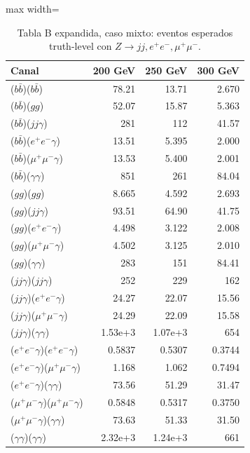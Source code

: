 \documentclass[10pt]{article}
\begin{document}
\begin{table}[H]
\centering
\scriptsize
\caption{Tabla B expandida, caso mixto: eventos esperados truth-level con $Z\to jj,e^+e^-,\mu^+\mu^-$.}
\label{tab:B_mixto}
\begin{adjustbox}{max width=\textwidth}
\begin{tabular}{lrrr}
\toprule
Canal & 200 GeV & 250 GeV & 300 GeV \\
\midrule
($b\bar b$)($b\bar b$) & 78.21 & 13.71 & 2.670 \\
($b\bar b$)($gg$) & 52.07 & 15.87 & 5.363 \\
($b\bar b$)($jj\gamma$) & 281 & 112 & 41.57 \\
($b\bar b$)($e^+e^-\gamma$) & 13.51 & 5.395 & 2.000 \\
($b\bar b$)($\mu^+\mu^-\gamma$) & 13.53 & 5.400 & 2.001 \\
($b\bar b$)($\gamma\gamma$) & 851 & 261 & 84.04 \\
($gg$)($gg$) & 8.665 & 4.592 & 2.693 \\
($gg$)($jj\gamma$) & 93.51 & 64.90 & 41.75 \\
($gg$)($e^+e^-\gamma$) & 4.498 & 3.122 & 2.008 \\
($gg$)($\mu^+\mu^-\gamma$) & 4.502 & 3.125 & 2.010 \\
($gg$)($\gamma\gamma$) & 283 & 151 & 84.41 \\
($jj\gamma$)($jj\gamma$) & 252 & 229 & 162 \\
($jj\gamma$)($e^+e^-\gamma$) & 24.27 & 22.07 & 15.56 \\
($jj\gamma$)($\mu^+\mu^-\gamma$) & 24.29 & 22.09 & 15.58 \\
($jj\gamma$)($\gamma\gamma$) & 1.53e+3 & 1.07e+3 & 654 \\
($e^+e^-\gamma$)($e^+e^-\gamma$) & 0.5837 & 0.5307 & 0.3744 \\
($e^+e^-\gamma$)($\mu^+\mu^-\gamma$) & 1.168 & 1.062 & 0.7494 \\
($e^+e^-\gamma$)($\gamma\gamma$) & 73.56 & 51.29 & 31.47 \\
($\mu^+\mu^-\gamma$)($\mu^+\mu^-\gamma$) & 0.5848 & 0.5317 & 0.3750 \\
($\mu^+\mu^-\gamma$)($\gamma\gamma$) & 73.63 & 51.33 & 31.50 \\
($\gamma\gamma$)($\gamma\gamma$) & 2.32e+3 & 1.24e+3 & 661 \\
\bottomrule
\end{tabular}
\end{adjustbox}
\end{table}
\end{document}
